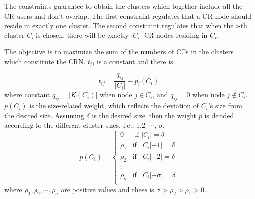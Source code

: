 \documentclass[times]{ettauth}
\newcommand{\ie}{i.e., }
\theoremstyle{mytheoremstyle}
\theoremstyle{mytheoremstyle}
\theoremstyle{mytheoremstyle}
\begin{document}
The constraints guarantee to obtain the clusters which together include all the CR users and don't overlap.
The first constraint regulates that a CR node should reside in exactly one cluster.
The second constraint regulates that when the $i$-th cluster $C_i$ is chosen, there will be exactly $|C_i|$ CR nodes residing in $C_i$.

The objective is to maximize the sum of the numbers of CCs in the clusters which constitute the CRN.
$t_{ij}$ is a constant and there is
%
%

\begin{equation}
t_{ij} = \frac{q_{ij}}{|C_i|} - p_i(C_i)
\end{equation}
where constant $q_{ij}= |K(C_i)|$ when node $j\in C_i$, and $q_{ij}= 0$ when node $j\notin C_i$.
$p(C_i)$ is the size-related weight, which reflects the deviation of $C_i$'s size from the desired size.
Assuming $\delta$ is the desired size, then the weight $p$ is decided according to the different cluster sizes, \ie 1,2, $\cdots$, $\sigma$.  
$$
p(C_i) = \left\{ \begin{array}{rl}
0 &\mbox{ if $|C_i|=\delta$} \\
\rho_1 &\mbox{if $||C_i|-1|=\delta$} \\
\rho_2 &\mbox{if $||C_i|-2|=\delta$} \\
\vdots\\
\rho_\sigma &\mbox{if $||C_i|-\sigma|=\delta$} \\
\end{array} \right.
$$
where $\rho_1, \rho_2, \cdots, \rho_\sigma$ are positive values and these is $\sigma > \rho_2> \rho_1>0$.

\end{document}
